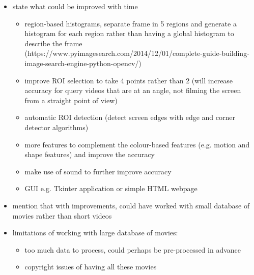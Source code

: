 \begin{itemize}
    \item state what could be improved with time
    \begin{itemize}
        \item region-based histograms, separate frame in 5 regions and generate a histogram for each region rather than having a global histogram to describe the frame (https://www.pyimagesearch.com/2014/12/01/complete-guide-building-image-search-engine-python-opencv/)
        \item improve ROI selection to take 4 points rather than 2 (will increase accuracy for query videos that are at an angle, not filming the screen from a straight point of view)
        \item automatic ROI detection (detect screen edges with edge and corner detector algorithms)
        \item more features to complement the colour-based features (e.g. motion and shape features) and improve the accuracy
        \item make use of sound to further improve accuracy
        \item GUI e.g. Tkinter application or simple HTML webpage
    \end{itemize} 
    \item mention that with improvements, could have worked with small database of movies rather than short videos
    \item limitations of working with large database of movies: 
    \begin{itemize}
        \item too much data to process, could perhaps be pre-processed in advance
        \item copyright issues of having all these movies
    \end{itemize}
\end{itemize}